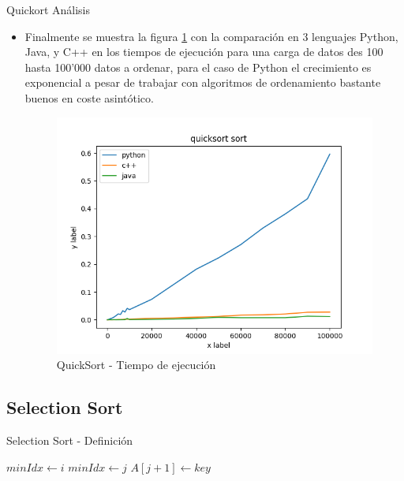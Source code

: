 \documentclass[11pt]{beamer}
\begin{document}
		    \begin{frame}{Quickort Análisis}
		        \begin{itemize}
                    \item Finalmente se muestra la figura \ref{fig:quicksort_diagram} con la comparación en 3 lenguajes {Python, Java, y C++} en los tiempos de ejecución para una carga de datos des 100 hasta 100'000 datos a ordenar, para el caso de Python el crecimiento es exponencial a pesar de trabajar con algoritmos de ordenamiento bastante buenos en coste asintótico.
                    
                    \begin{figure}[H]
                        \centering \includegraphics[scale=0.35]{img/quicksort_diagram.png}
                        \caption{QuickSort - Tiempo de ejecución}
                        \label{fig:quicksort_diagram}
                    \end{figure}
		        \end{itemize}
		    \end{frame}

		\subsection{Selection Sort}
		    \begin{frame}{Selection Sort - Definición}
    		    \begin{algorithm}[H]
                    \begin{algorithmic}[1]
                            \STATE $minIdx \gets i$
                                    \STATE $minIdx \gets j$ 
                                \ENDIF
                            \ENDFOR
                            \STATE $A[j + 1] \gets key$
                        \ENDFOR
                    \end{algorithmic}
                    \caption{SELECTION-SORT(A)}
                    \label{alg:selection-sort}
                \end{algorithm}
    		\end{frame}
    		
\end{document}

